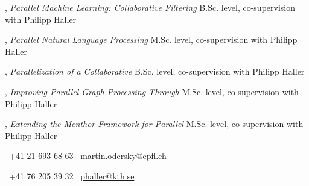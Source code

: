 \documentclass[9pt]{article}
\begin{document}
, {\em Parallel Machine Learning: Collaborative Filtering} 
\newline{}
\newline\noindent B.Sc. level, co-supervision with Philipp Haller
\medskip

, {\em Parallel Natural Language Processing} 
\newline{}
\newline\noindent M.Sc. level, co-supervision with Philipp Haller
\medskip

, {\em Parallelization of a Collaborative} 
\newline{}
\newline\noindent B.Sc. level, co-supervision with Philipp Haller
\medskip

, {\em Improving Parallel Graph Processing Through} 
\newline{}
\newline\noindent M.Sc. level, co-supervision with Philipp Haller
\medskip

, {\em Extending the Menthor Framework for Parallel} 
\newline{}
\newline\noindent M.Sc. level, co-supervision with Philipp Haller
\medskip

\medskip
{}

\newline{}
\newline{}
\newline\noindent \Telefon~+41 21 693 68 63
\newline\noindent \Letter~\href{mailto:martin.odersky@epfl.ch}{martin.odersky@epfl.ch}
\medskip

\newline{}
\newline{}
\newline\noindent \Telefon~+41 76 205 39 32
\newline\noindent \Letter~\href{mailto:phaller@kth.se}{phaller@kth.se}
\medskip
\end{document}
